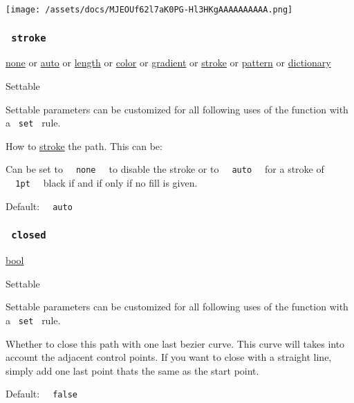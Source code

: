 \texttt{[image: /assets/docs/MJEOUf62l7aK0PG-Hl3HKgAAAAAAAAAA.png]}

\subsubsection{\texorpdfstring{\texttt{\ stroke\ }}{ stroke }}\label{parameters-stroke}

\href{/docs/reference/foundations/none/}{none} {or}
\href{/docs/reference/foundations/auto/}{auto} {or}
\href{/docs/reference/layout/length/}{length} {or}
\href{/docs/reference/visualize/color/}{color} {or}
\href{/docs/reference/visualize/gradient/}{gradient} {or}
\href{/docs/reference/visualize/stroke/}{stroke} {or}
\href{/docs/reference/visualize/pattern/}{pattern} {or}
\href{/docs/reference/foundations/dictionary/}{dictionary}

{{ Settable }}

\label{parameters-stroke-settable-tooltip}
Settable parameters can be customized for all following uses of the
function with a \texttt{\ set\ } rule.

How to \href{/docs/reference/visualize/stroke/}{stroke} the path. This
can be:

Can be set to \texttt{\ }{\texttt{\ none\ }}\texttt{\ } to disable the
stroke or to \texttt{\ }{\texttt{\ auto\ }}\texttt{\ } for a stroke of
\texttt{\ }{\texttt{\ 1pt\ }}\texttt{\ } black if and if only if no fill
is given.

Default: \texttt{\ }{\texttt{\ auto\ }}\texttt{\ }

\subsubsection{\texorpdfstring{\texttt{\ closed\ }}{ closed }}\label{parameters-closed}

\href{/docs/reference/foundations/bool/}{bool}

{{ Settable }}

\label{parameters-closed-settable-tooltip}
Settable parameters can be customized for all following uses of the
function with a \texttt{\ set\ } rule.

Whether to close this path with one last bezier curve. This curve will
takes into account the adjacent control points. If you want to close
with a straight line, simply add one last point that\textquotesingle s
the same as the start point.

Default: \texttt{\ }{\texttt{\ false\ }}\texttt{\ }

